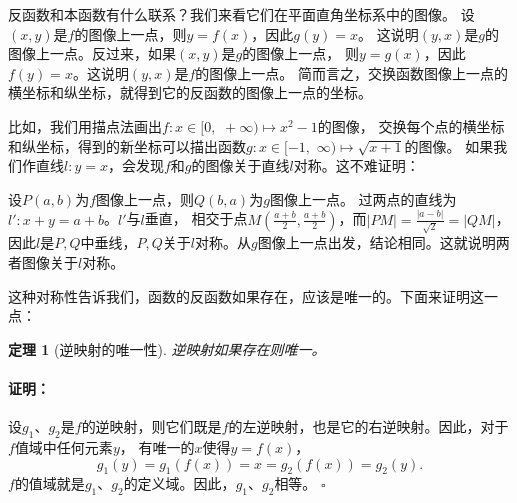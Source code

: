 \documentclass[12pt,UTF8]{ctexbook}
\newtheorem{tm}{定理}[section]
\renewenvironment{proof}{\paragraph{\textbf{证明：}}}{\hfill$\square$}
\begin{document}
反函数和本函数有什么联系？我们来看它们在平面直角坐标系中的图像。
设$(x, y)$是$f$的图像上一点，则$y = f(x)$，因此$g(y) = x$。
这说明$(y, x)$是$g$的图像上一点。反过来，如果$(x,y)$是$g$的图像上一点，
则$y = g(x)$，因此$f(y) = x$。这说明$(y, x)$是$f$的图像上一点。
简而言之，交换函数图像上一点的横坐标和纵坐标，就得到它的反函数的图像上一点的坐标。

比如，我们用描点法画出$f: x\in[0,\,\,+\infty) \mapsto x^2 - 1$的图像，
交换每个点的横坐标和纵坐标，得到的新坐标可以描出函数$g:x\in[-1, \,\,\infty)\mapsto\sqrt{x + 1}$的图像。
如果我们作直线$l: y = x$，会发现$f$和$g$的图像关于直线$l$对称。这不难证明：

设$P(a,b)$为$f$图像上一点，则$Q(b,a)$为$g$图像上一点。
过两点的直线为$l':x + y = a + b$。$l'$与$l$垂直，
相交于点$M(\frac{a+b}{2}, \frac{a+b}{2})$，而$|PM| = \frac{|a-b|}{\sqrt{2}} = |QM|$，
因此$l$是$P,Q$中垂线，$P,Q$关于$l$对称。从$g$图像上一点出发，结论相同。这就说明两者图像关于$l$对称。

这种对称性告诉我们，函数的反函数如果存在，应该是唯一的。下面来证明这一点：

\begin{tm}[逆映射的唯一性]
    逆映射如果存在则唯一。
\end{tm}
\begin{proof}
    设$g_1$、$g_2$是$f$的逆映射，则它们既是$f$的左逆映射，也是它的右逆映射。因此，对于$f$值域中任何元素$y$，
    有唯一的$x$使得$y = f(x)$，
    $$ g_1(y) = g_1(f(x)) = x = g_2(f(x)) = g_2(y).$$
    $f$的值域就是$g_1$、$g_2$的定义域。因此，$g_1$、$g_2$相等。
\end{proof}
\end{document}
